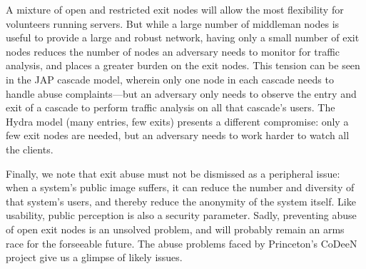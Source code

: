\documentclass[times,10pt,twocolumn]{article}
\begin{document}

A mixture of open and restricted exit nodes will allow the most
flexibility for volunteers running servers. But while a large number
of middleman nodes is useful to provide a large and robust network,
having only a small number of exit nodes reduces the number of nodes
an adversary needs to monitor for traffic analysis, and places a
greater burden on the exit nodes.  This tension can be seen in the JAP
cascade model, wherein only one node in each cascade needs to handle
abuse complaints---but an adversary only needs to observe the entry
and exit of a cascade to perform traffic analysis on all that
cascade's users.  The Hydra model (many entries, few exits) presents a
different compromise: only a few exit nodes are needed, but an
adversary needs to work harder to watch all the clients.

Finally, we note that exit abuse must not be dismissed as a peripheral
issue: when a system's public image suffers, it can reduce the number
and diversity of that system's users, and thereby reduce the anonymity
of the system itself.  Like usability, public perception is also a
security parameter.  Sadly, preventing abuse of open exit nodes is an
unsolved problem, and will probably remain an arms race for the
forseeable future.  The abuse problems faced by Princeton's CoDeeN
project \cite{darkside} give us a glimpse of likely issues.

\label{subsec:dirservers}
\end{document}
